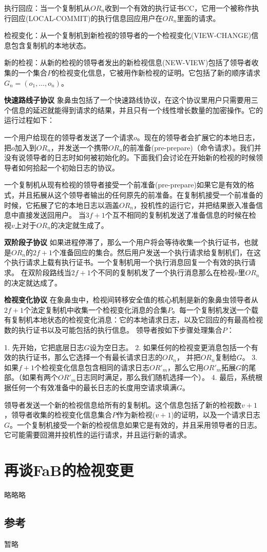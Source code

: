 \documentclass[UTF8]{ctexart}
\begin{document}
执行回应：当一个复制机从$OR_n$收到一个有效的执行证书CC，它用一个被称作执行回应(LOCAL-COMMIT)的执行信息回应用户在$OR_n$里面的请求。

检视变化：从一个复制机到新检视的领导者的一个检视变化(VIEW-CHANGE)信息包含复制机的本地状态。

新的检视：从新的检视的领导者发出的新检视信息(NEW-VIEW)包括了领导者收集的一个集合$P$的检视变化信息，它被用作新检视的证明。它包括了新的顺序请求$G_n = (o_1, \ldots, o_n)$。

\textbf{快速路线子协议} \hspace{3mm} 象鼻虫包括了一个快速路线协议，在这个协议里用户只需要用三个信息的延迟就能得到请求的结果，并且只有一个线性增长数量的加密操作。它的运行过程如下：

一个用户给现在的领导者发送了一个请求$o$。现在的领导者会扩展它的本地日志，把$o$加入到$OR_n$，并发送一个携带$OR_n$的前准备(pre-prepare)（命令请求）。我们并没有说领导者的日志时如何被初始化的。下面我们会讨论在开始新的检视的时候领导者如何拾起一个初始日志的协议。

一个复制机从现有检视的领导者接受一个前准备(pre-prepare)如果它是有效的格式，并且拓展从这个领导者输出的任何原先的前准备。在复制机接受一个前准备的时候，它拓展了它的本地日志以涵盖$OR_n$，投机性的运行它，并把结果嵌入准备信息中直接发送回用户。
当$3f + 1$个互不相同的复制机发送了准备信息的时候在检视$v$上对于$OR_n$的决定就生成了。

\textbf{双阶段子协议} \hspace{3mm} 如果进程停滞了，那么一个用户将会等待收集一个执行证书，也就是$OR_n$的$2f + 1$个准备回应的集合。然后用户发送一个执行请求给复制机们，在这个执行请求上载有执行证书。一个复制机用一个执行消息回复一个有效的执行请求。
在双阶段路线当$2f + 1$个不同的复制机发了一个执行消息那么在检视$v$里$OR_n$的决定就达成了。

\textbf{检视变化协议} \hspace{3mm} 在象鼻虫中，检视间转移安全值的核心机制是新的象鼻虫领导者从$2f + 1$个法定复制机中收集一个检视变化消息的合集$P$。每一个复制机发送一个载有复制机本地状态的检视变化消息：它的本地请求日志，以及它回应的有最高检视数的执行证书以及可能包括的执行信息。
领导者按如下步骤处理集合$P$：

1. 先开始，它把底层日志$G$设为空日志。
2. 如果任何的检视变更消息包括一个有效的执行证书，那么它选择一个有最长请求日志的$OR_n$， 并把$OR_n$复制给$G$。
3. 如果$f + 1$个检视变化信息包含相同的请求日志$OR'_m$，那么它用$OR'_m$拓展$G$的尾部。（如果有两个$OR'_m$日志同时满足，那么我们随机选择一个）。
4. 最后，系统根据任何一个有效准备中的最长日志的长度用空请求填满$G$。

领导者发送一个新的检视信息给所有的复制机。这个信息包括了新的检视数$v + 1$，领导者收集的检视变化信息集合$P$作为新检视($v + 1$)的证明，以及一个请求日志$G$。一个复制机接受一个新的检视信息如果它是有效的，并且采用领导者的日志。它可能需要回溯并投机性的运行请求，并且运行新的请求。

\section{再谈FaB的检视变更}\label{sec:FaB}
略略略

\subsection*{参考}
暂略
\end{document}

